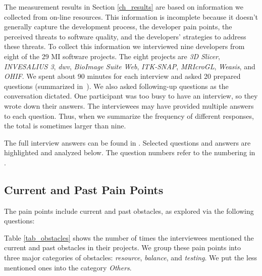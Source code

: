 \documentclass[final, 3p, times, authoryear]{elsarticle}
\begin{document}
The measurement results in Section \ref{ch_results} are based on information we
collected from on-line resources. This information is incomplete because it
doesn't generally capture the development process, the developer pain points,
the perceived threats to software quality, and the developers' strategies to
address these threats. To collect this information we interviewed nine
developers from eight of the 29 MI software projects. The eight projects are
\textit{3D Slicer}, \textit{INVESALIUS 3}, \textit{dwv}, \textit{BioImage Suite
Web}, \textit{ITK-SNAP}, \textit{MRIcroGL}, \textit{Weasis}, and \textit{OHIF}.
We spent about 90 minutes for each interview and asked 20 prepared questions
(summarized in~\citet{SmithEtAl2021}). We also asked following-up questions as
the conversation dictated. One participant was too busy to have an interview, so
they wrote down their answers. The interviewees may have provided multiple
answers to each question. Thus, when we summarize the frequency of different
responses, the total is sometimes larger than nine.

The full interview answers can be found in \citet{Dong2021}.  Selected questions
and answers are highlighted and analyzed below.  The question numbers refer to
the numbering in \citet{SmithEtAl2021}.

\subsection{Current and Past Pain Points} \label{sec_interview_pain_points}

The pain points include current and past obstacles, as explored via the
following questions:


Table \ref{tab_obstacles} shows the number of times the interviewees mentioned
the current and past obstacles in their projects.   We group these pain points
into three major categories of obstacles: \textit{resource}, \textit{balance},
and \textit{testing}. We put the less mentioned ones into the category
\textit{Others}. 
\end{document}
